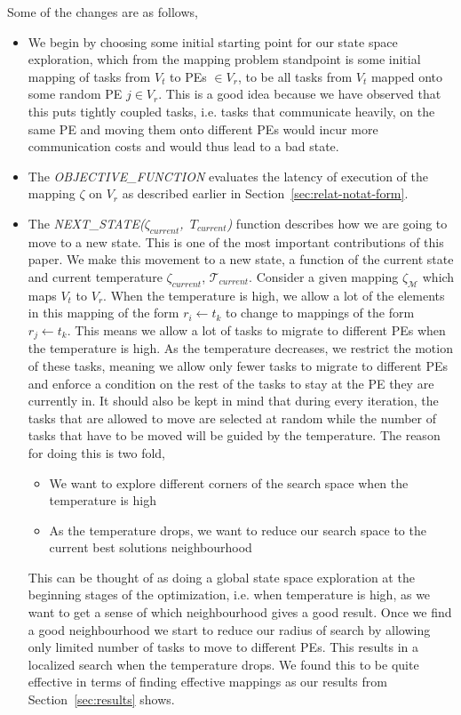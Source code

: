 Some of the changes are as follows,

\begin{itemize}

\item We begin by choosing some initial starting point for our state space exploration, which from
the mapping problem standpoint is some initial mapping of tasks from $V_t$ to
PEs $\in V_r$, to be all tasks from $V_t$ mapped onto
some random PE $j \in V_r$. This is a good idea because we have observed that
this puts tightly coupled tasks, i.e. tasks that communicate heavily, on the
same PE and moving them onto different PEs would incur more communication
costs and would thus lead to a bad state.

\item The \textit{OBJECTIVE\_FUNCTION} evaluates the latency of execution of
the mapping $\zeta$ on $V_r$ as described earlier in
Section~\ref{sec:relat-notat-form}. 

\item The \mbox{\textit{NEXT\_STATE($\zeta_{current}$, $T_{current}$)}} function
describes how we are going to move to a new state. This is one of the most
important contributions of this paper. We make this movement to a new state, a
function of the current state and current temperature $\zeta_{current}$,
$\mathcal{T}_{current}$. Consider a
given mapping $\zeta_\mathcal{M}$ which maps $V_t$ to $V_r$. When the
temperature is high, we allow a lot of the elements in this mapping of the form
$r_i
\leftarrow t_k$ to change to mappings of the form $r_j \leftarrow t_k$. This
means we allow a lot of tasks to migrate to different PEs when the temperature
is high. As the temperature decreases, we restrict the motion of these tasks,
meaning we allow only fewer tasks to migrate to different PEs and enforce a
condition on the rest of the tasks to stay at the PE they are currently in. It
should also be kept in mind that during every iteration, the tasks that are
allowed to move are selected at random while the number of tasks that have to be
moved will be guided by the temperature. The reason for doing this is two fold,
\begin{itemize}
\item We want to explore different corners of the search space when the
temperature is high
\item As the temperature drops, we want to reduce our search space to the
current best solutions neighbourhood
\end{itemize}
This can be thought of as doing a global state space exploration at the
beginning stages of the optimization, i.e. when temperature is high, as
we want to get a sense of which neighbourhood gives a good result. Once
we find a good neighbourhood we start to reduce our radius of search by
allowing only limited number of tasks to move to different PEs. This
results in a localized search when the temperature drops. We found this
to be quite effective in terms of finding effective mappings as our
results from Section~\ref{sec:results} shows.


\end{itemize}
